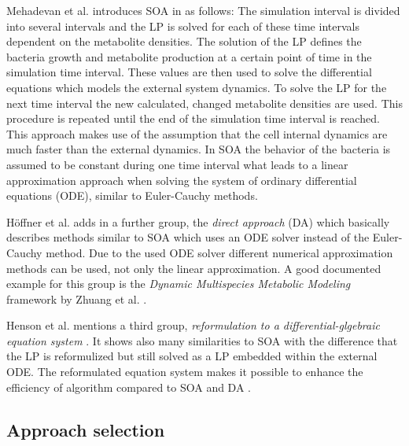 \documentclass[a4paper,10pt]{article}
\begin{document}
Mehadevan et al. introduces SOA in \cite{mahadevan_dynamic_2002} as follows: The simulation interval is divided into several intervals and the LP is solved for each
of these time intervals dependent on the metabolite densities. The solution of the LP defines the bacteria growth and metabolite
production at a certain point of time in the simulation time interval. These values are then used to solve the differential equations
which models the external system dynamics. To solve the LP for the next time interval the new calculated, changed metabolite densities
are used. This procedure is repeated until the end of the simulation time interval is reached. This approach makes use of the
assumption that the cell internal dynamics are much faster than the external dynamics. In SOA the behavior of the bacteria is assumed
to be constant during one time interval what leads to a linear approximation approach when solving the system of ordinary differential
equations (ODE), similar to Euler-Cauchy methods.

Höffner et al. adds in \cite{hoffner_reliable_2013} a further group, the \textit{direct approach} (DA) which basically describes methods
similar to SOA which uses an ODE solver instead of the Euler-Cauchy method. Due to the used ODE solver different numerical approximation
methods can be used, not only the linear approximation. A good documented example for this group is the \textit{Dynamic Multispecies
Metabolic Modeling} framework by Zhuang et al. \cite{zhuang_design_2012}.

Henson et al. mentions a third group, \textit{reformulation to a differential-glgebraic equation system} \cite{henson_dynamic_2014}.
It shows also many similarities to SOA with the difference that the LP is reformulized but still solved as a LP embedded within 
the external ODE. The reformulated equation system makes it possible to enhance the efficiency of algorithm compared to SOA and DA
\cite{hoffner_reliable_2013}.

\subsection{Approach selection}
\end{document}
